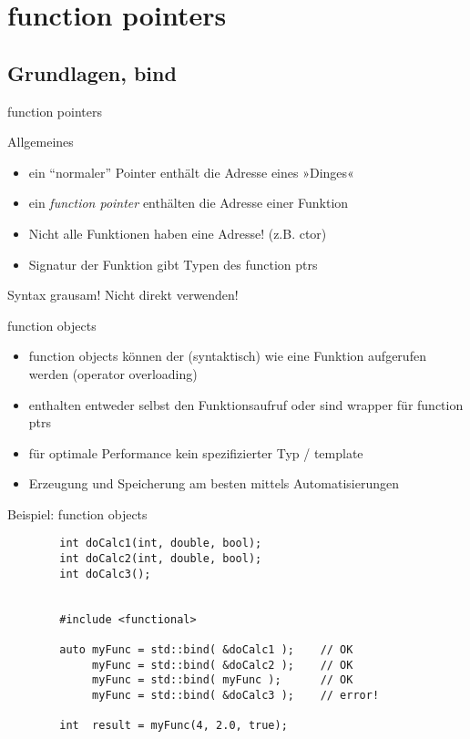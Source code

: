 \section{function pointers}


\subsection{Grundlagen, bind}

\begin{frame}{function pointers}
	\footnotesize
	
	\begin{block}{Allgemeines}
		\begin{itemize}
			\item ein \enquote{normaler} Pointer enthält die Adresse eines »Dinges«
			\item ein \emph{function pointer} enthälten die Adresse einer Funktion
			\item Nicht alle Funktionen haben eine Adresse! (z.B. ctor)
			\item Signatur der Funktion gibt Typen des function ptrs
		\end{itemize}
	\end{block}
	
	\pause
	
	Syntax grausam! Nicht direkt verwenden!
	
	\begin{block}{function objects}
		\begin{itemize}
			\item function objects können der (syntaktisch) wie eine Funktion aufgerufen werden (operator overloading)
			\item enthalten entweder selbst den Funktionsaufruf oder sind wrapper für function ptrs
			\item für optimale Performance kein spezifizierter Typ / template
			\item Erzeugung und Speicherung am besten mittels Automatisierungen
		\end{itemize}
	\end{block}
\end{frame}

\begin{frame}[fragile]{Beispiel: function objects}
	\begin{lstlisting}
		int doCalc1(int, double, bool);
		int doCalc2(int, double, bool);
		int doCalc3();
		
		
		#include <functional>
		
		auto myFunc = std::bind( &doCalc1 );	// OK
		     myFunc = std::bind( &doCalc2 );	// OK
		     myFunc = std::bind( myFunc );		// OK
		     myFunc = std::bind( &doCalc3 );	// error!
		
		int  result = myFunc(4, 2.0, true);
	\end{lstlisting}
\end{frame}

